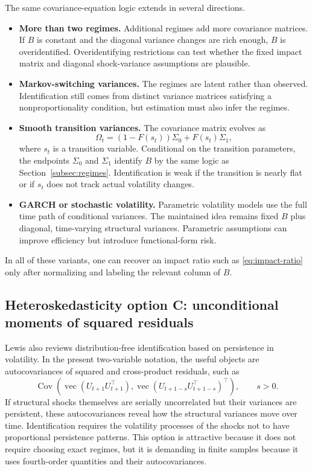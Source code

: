 \documentclass[11pt]{article}
\newcommand{\T}{\top}
\newcommand{\Cov}{\operatorname{Cov}}
\theoremstyle{plain}
\theoremstyle{definition}
\theoremstyle{remark}
\begin{document}
The same covariance-equation logic extends in several directions.
\begin{itemize}
\item \textbf{More than two regimes.} Additional regimes add more covariance
matrices. If $B$ is constant and the diagonal variance changes are rich enough,
$B$ is overidentified. Overidentifying restrictions can test whether the fixed
impact matrix and diagonal shock-variance assumptions are plausible.
\item \textbf{Markov-switching variances.} The regimes are latent rather than
observed. Identification still comes from distinct variance matrices satisfying
a nonproportionality condition, but estimation must also infer the regimes.
\item \textbf{Smooth transition variances.} The covariance matrix evolves as
\begin{equation}
\Omega_t=(1-F(s_t))\Sigma_0+F(s_t)\Sigma_1,
\label{eq:smooth}
\end{equation}
where $s_t$ is a transition variable. Conditional on the transition parameters,
the endpoints $\Sigma_0$ and $\Sigma_1$ identify $B$ by the same logic as
Section~\ref{subsec:regimes}. Identification is weak if the transition is nearly
flat or if $s_t$ does not track actual volatility changes.
\item \textbf{GARCH or stochastic volatility.} Parametric volatility models use
the full time path of conditional variances. The maintained idea remains fixed
$B$ plus diagonal, time-varying structural variances. Parametric assumptions can
improve efficiency but introduce functional-form risk.
\end{itemize}
In all of these variants, one can recover an impact ratio such as
\eqref{eq:impact-ratio} only after normalizing and labeling the relevant column
of $B$.

\subsection{Heteroskedasticity option C: unconditional moments of squared residuals}

Lewis also reviews distribution-free identification based on persistence in
volatility. In the present two-variable notation, the useful objects are
autocovariances of squared and cross-product residuals, such as
\begin{equation}
\Cov\left(\operatorname{vec}(U_{t+1}U_{t+1}^\T),
\operatorname{vec}(U_{t+1-s}U_{t+1-s}^\T)^\T\right),
\qquad s>0.
\label{eq:squared-autocovs}
\end{equation}
If structural shocks themselves are serially uncorrelated but their variances are
persistent, these autocovariances reveal how the structural variances move over
time. Identification requires the volatility processes of the shocks not to have
proportional persistence patterns. This option is attractive because it does not
require choosing exact regimes, but it is demanding in finite samples because it
uses fourth-order quantities and their autocovariances.
\end{document}
